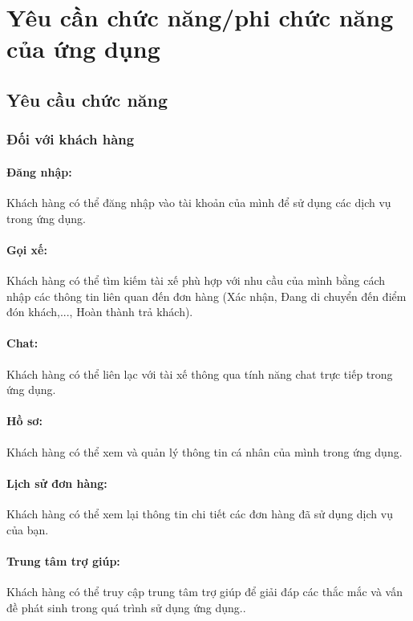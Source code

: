 \documentclass[a4paper,13pt]{report}
\numberwithin{figure}{chapter}
\numberwithin{figure}{section}
\begin{document}

\section{Yêu cần chức năng/phi chức năng của ứng dụng}
\subsection{Yêu cầu chức năng}
\subsubsection{Đối với khách hàng}
\paragraph{Đăng nhập:}  Khách hàng có thể đăng nhập vào tài khoản của mình để sử dụng các dịch vụ trong ứng dụng.
\paragraph{Gọi xế:} Khách hàng có thể tìm kiếm tài xế phù hợp với nhu cầu của mình bằng cách nhập các thông tin liên quan đến  đơn hàng (Xác nhận, Đang di chuyển đến điểm đón khách,..., Hoàn thành trả khách).
\paragraph{Chat:} Khách hàng có thể liên lạc với tài xế thông qua tính năng chat trực tiếp trong ứng dụng.
\paragraph{Hồ sơ:} Khách hàng có thể xem và quản lý thông tin cá nhân của mình trong ứng dụng.
\paragraph{Lịch sử  đơn hàng:} Khách hàng có thể xem lại thông tin chi tiết các  đơn hàng đã sử dụng dịch vụ của bạn.
\paragraph{Trung tâm trợ giúp:} Khách hàng có thể truy cập trung tâm trợ giúp để giải đáp các thắc mắc và vấn đề phát sinh trong quá trình sử dụng ứng dụng..
\end{document}
